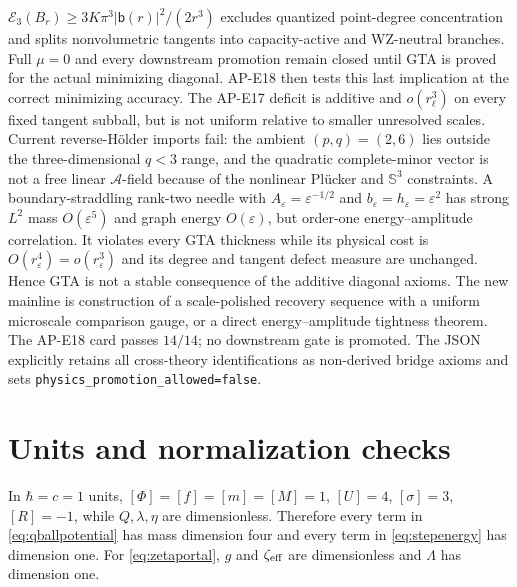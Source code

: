 \documentclass[11pt]{article}
\numberwithin{equation}{section}
\begin{document}
$\mathcal E_3(B_r)\geq3K\pi^3|\mathsf b(r)|^2/(2r^3)$ excludes quantized
point-degree concentration and splits nonvolumetric tangents into
capacity-active and WZ-neutral branches.  Full $\mu=0$ and every downstream
promotion remain closed until GTA is proved for the actual minimizing
diagonal.
AP-E18 then tests this last implication at the correct minimizing accuracy.
The AP-E17 deficit is additive and $o(r_\ell^3)$ on every fixed tangent
subball, but is not uniform relative to smaller unresolved scales.  Current
reverse-H\"older imports fail: the ambient $(p,q)=(2,6)$ lies outside the
three-dimensional $q<3$ range, and the quadratic complete-minor vector is
not a free linear $\mathscr A$-field because of the nonlinear Pl\"ucker and
$\mathbb S^3$ constraints.  A boundary-straddling rank-two needle with
$A_\varepsilon=\varepsilon^{-1/2}$ and
$b_\varepsilon=h_\varepsilon=\varepsilon^2$ has strong $L^2$ mass
$O(\varepsilon^5)$ and graph energy $O(\varepsilon)$, but order-one
energy--amplitude correlation.  It violates every GTA thickness while its
physical cost is $O(r_\varepsilon^4)=o(r_\varepsilon^3)$ and its degree and
tangent defect measure are unchanged.  Hence GTA is not a stable consequence
of the additive diagonal axioms.  The new mainline is construction of a
scale-polished recovery sequence with a uniform microscale comparison gauge,
or a direct energy--amplitude tightness theorem.  The AP-E18 card passes
$14/14$; no downstream gate is promoted.
The JSON explicitly retains all
cross-theory identifications as non-derived bridge axioms and sets
\texttt{physics\_promotion\_allowed=false}.













\appendix

\section{Units and normalization checks}

In \(\hbar=c=1\) units, \([\Phi]=[f]=[m]=[M]=1\),
\([U]=4\), \([\sigma]=3\), \([R]=-1\), while \(Q,\lambda,\eta\) are
dimensionless.  Therefore every term in \eqref{eq:qballpotential} has mass
dimension four and every term in \eqref{eq:stepenergy} has dimension one.
For \eqref{eq:zetaportal}, \(g\) and \(\zeta_{\rm eff}\) are dimensionless
and \(\Lambda\) has dimension one.
\end{document}
